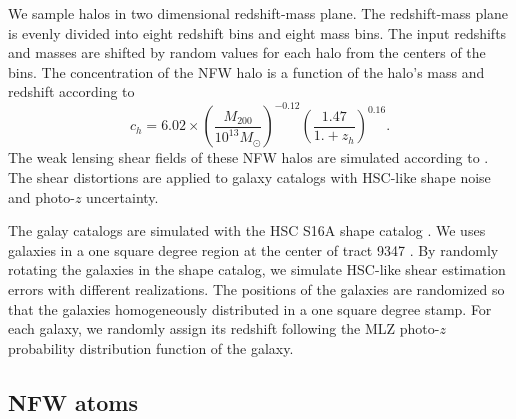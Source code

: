 \documentclass[twocolumn]{aastex62}
\begin{document}
We sample halos in two dimensional redshift-mass plane. The redshift-mass plane is evenly divided into eight redshift bins
and eight mass bins. The input redshifts and masses are shifted by random values for each halo from the centers 
of the bins.
The concentration of the NFW halo is a function of the halo's mass and redshift according to 
\citet{c-M_Magneticum-Ragagnin2019}
\begin{equation}
c_{h}=6.02\times(\frac{M_{200}}{10^{13} M_{\odot}})^{-0.12}(\frac{1.47}{1.+z_h})^{0.16}.
\end{equation}
The weak lensing shear fields of these NFW halos are simulated according to \citet{haloModel-TJ2003-3pt}. The shear 
distortions are applied to galaxy catalogs with HSC-like shape noise and photo-$z$ uncertainty. 

The galay catalogs are simulated with the HSC S16A shape catalog \citep{HSC1-catalog}. 
We uses galaxies in a one square degree region at the center of tract 9347 \citep{HSC1-data}.
By randomly rotating the galaxies in the shape catalog, we simulate HSC-like shear estimation errors 
with different realizations.
The positions of the galaxies are randomized so that the galaxies homogeneously distributed in a one square degree 
stamp.
For each galaxy, we randomly assign its redshift following the MLZ photo-$z$ probability distribution function 
\citep{HSC1-photoz} of the galaxy.

\subsection{NFW atoms}
\label{subsec:test-nfw}
\end{document}
